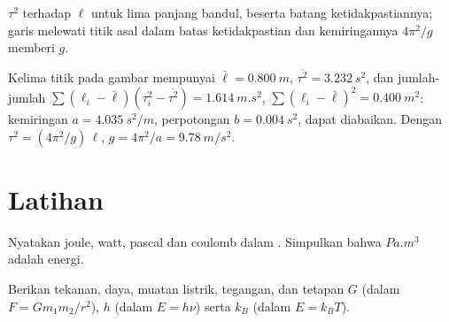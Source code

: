 \begin{omfigure}

{\small $\tau^2$ terhadap $\ell$ untuk lima panjang bandul, beserta
batang ketidakpastiannya; garis  melewati titik asal
dalam batas ketidakpastian dan kemiringannya $4\pi^2/g$ memberi $g$.}
\end{omfigure}

\begin{example}\label{ex:b1:units-dimensions:slope}
Kelima titik pada gambar mempunyai $\bar\ell = \qty{0.800}{m}$,
$\overline{\tau^2} = \qty{3.232}{s^2}$, dan jumlah-jumlah
$\sum (\ell_i - \bar\ell)(\tau_i^2 - \overline{\tau^2}) = \qty{1.614}{m.s^2}$,
$\sum (\ell_i - \bar\ell)^2 = \qty{0.400}{m^2}$: kemiringan
$a = \qty{4.035}{s^2/m}$, perpotongan $b = \qty{0.004}{s^2}$, dapat
diabaikan. Dengan $\tau^2 = (4\pi^2/g)\,\ell$, $g = 4\pi^2/a = \qty{9.78}{m/s^2}$.
\end{example}

\section{Latihan}

\begin{exercise}[$\star$]\label{exo:b1:units-dimensions:1}
Nyatakan joule, watt, pascal dan coulomb dalam .
Simpulkan bahwa $\unit{Pa.m^3}$ adalah  energi.
\end{exercise}

\begin{exercise}[$\star$]\label{exo:b1:units-dimensions:2}
Berikan  tekanan, daya, muatan listrik, tegangan, dan 
tetapan $G$ (dalam $F = Gm_1m_2/r^2$), $h$ (dalam $E = h\nu$) serta
$k_B$ (dalam $E = k_B T$).
\end{exercise}

